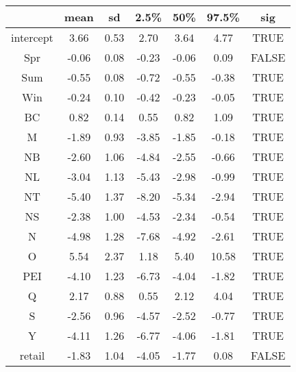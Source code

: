 \begin{table}[ht]
\centering
\begin{tabular}{|c|c|c|c|c|c|c|}
  \hline
 & mean & sd & 2.5\% & 50\% & 97.5\% & sig \\ 
  \hline
intercept & 3.66 & 0.53 & 2.70 & 3.64 & 4.77 & TRUE \\ 
  Spr & -0.06 & 0.08 & -0.23 & -0.06 & 0.09 & FALSE \\ 
  Sum & -0.55 & 0.08 & -0.72 & -0.55 & -0.38 & TRUE \\ 
  Win & -0.24 & 0.10 & -0.42 & -0.23 & -0.05 & TRUE \\ 
  BC & 0.82 & 0.14 & 0.55 & 0.82 & 1.09 & TRUE \\ 
  M & -1.89 & 0.93 & -3.85 & -1.85 & -0.18 & TRUE \\ 
  NB & -2.60 & 1.06 & -4.84 & -2.55 & -0.66 & TRUE \\ 
  NL & -3.04 & 1.13 & -5.43 & -2.98 & -0.99 & TRUE \\ 
  NT & -5.40 & 1.37 & -8.20 & -5.34 & -2.94 & TRUE \\ 
  NS & -2.38 & 1.00 & -4.53 & -2.34 & -0.54 & TRUE \\ 
  N & -4.98 & 1.28 & -7.68 & -4.92 & -2.61 & TRUE \\ 
  O & 5.54 & 2.37 & 1.18 & 5.40 & 10.58 & TRUE \\ 
  PEI & -4.10 & 1.23 & -6.73 & -4.04 & -1.82 & TRUE \\ 
  Q & 2.17 & 0.88 & 0.55 & 2.12 & 4.04 & TRUE \\ 
  S & -2.56 & 0.96 & -4.57 & -2.52 & -0.77 & TRUE \\ 
  Y & -4.11 & 1.26 & -6.77 & -4.06 & -1.81 & TRUE \\ 
  retail & -1.83 & 1.04 & -4.05 & -1.77 & 0.08 & FALSE \\ 
   \hline
\end{tabular}
\end{table}
